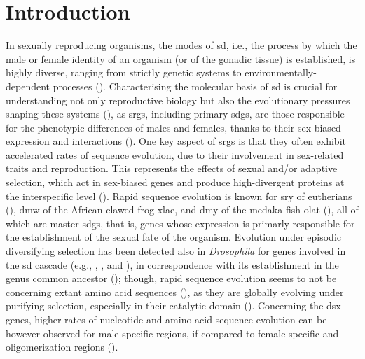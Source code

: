 \section{Introduction} \label{chapter:molecularEvolution-introduction}
In sexually reproducing organisms, the modes of \gls{sd}, i.e., the process by which the male or female identity of an organism (or of the gonadic tissue) is established, is highly diverse, ranging from strictly genetic systems to environmentally-dependent processes (). Characterising the molecular basis of \gls{sd} is crucial for understanding not only reproductive biology but also the evolutionary pressures shaping these systems (), as \glspl{srg}, including primary \glspl{sdg}, are those responsible for the phenotypic differences of males and females, thanks to their sex-biased expression and interactions (). One key aspect of \glspl{srg} is that they often exhibit accelerated rates of sequence evolution, due to their involvement in sex-related traits and reproduction. This represents the effects of sexual and/or adaptive selection, which act in sex-biased genes and produce high-divergent proteins at the interspecific level (). Rapid sequence evolution is known for \gls{sry} of eutherians (), \gls{dmw} of the African clawed frog \gls{xlae}, and \gls{dmy} of the medaka fish \gls{olat} (), all of which are master \glspl{sdg}, that is, genes whose expression is primarly responsible for the establishment of the sexual fate of the organism. Evolution under episodic diversifying selection has been detected also in \textit{Drosophila} for genes involved in the \gls{sd} cascade (e.g., , , and ), in correspondence with its establishment in the genus common ancestor (); though, rapid sequence evolution seems to not be concerning extant amino acid sequences (), as they are globally evolving under purifying selection, especially in their catalytic domain (). Concerning the \gls{dsx} genes, higher rates of nucleotide and amino acid sequence evolution can be however observed for male-specific regions, if compared to female-specific and oligomerization regions ().

